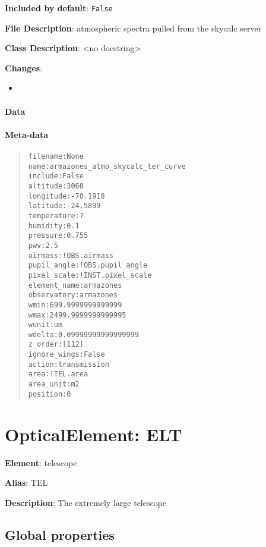 \documentclass[a4paper]{article}
\begin{document}
\textbf{Included by default}: \texttt{False}

\textbf{File Description}: atmospheric spectra pulled from the skycalc server

\textbf{Class Description}: <no docstring>

\textbf{Changes}:

\begin{itemize}
\item \end{itemize}


\paragraph{Data%
  \label{id3}%
}


\paragraph{Meta-data%
  \label{id4}%
}

\begin{quote}
\begin{alltt}
    filename : None
        name : armazones_atmo_skycalc_ter_curve
     include : False
    altitude : 3060
   longitude : -70.1918
    latitude : -24.5899
 temperature : 7
    humidity : 0.1
    pressure : 0.755
         pwv : 2.5
     airmass : !OBS.airmass
 pupil_angle : !OBS.pupil_angle
 pixel_scale : !INST.pixel_scale
element_name : armazones
 observatory : armazones
        wmin : 699.9999999999999
        wmax : 2499.9999999999995
       wunit : um
      wdelta : 0.09999999999999999
     z_order : [112]
ignore_wings : False
      action : transmission
        area : !TEL.area
   area_unit : m2
    position : 0
\end{alltt}
\end{quote}


\section{OpticalElement: \textquotedbl{}ELT\textquotedbl{}%
  \label{opticalelement-elt}%
}

\textbf{Element}: telescope

\textbf{Alias}: TEL

\textbf{Description}: The extremely large telescope


\subsection{Global properties%
  \label{id5}%
}
\end{document}
